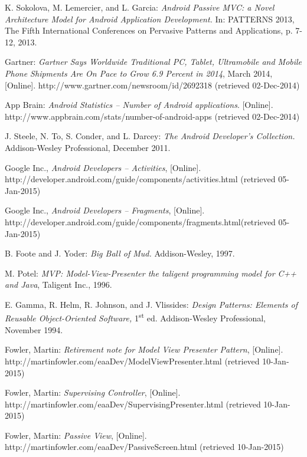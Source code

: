 \begin{thebibliography}{1}

K. Sokolova, M. Lemercier, and L. Garcia: \emph{Android Passive MVC: a Novel Architecture Model for Android Application Development.} In: PATTERNS 2013, The Fifth International Conferences on Pervasive Patterns and Applications, p. 7-12, 2013.

Gartner: \emph{Gartner Says Worldwide Traditional PC, Tablet, Ultramobile and 
Mobile Phone Shipments Are On Pace to Grow 6.9 Percent in 2014}, March 2014, 
[Online]. http://www.gartner.com/newsroom/id/2692318 (retrieved 02-Dec-2014)

App Brain: \emph{Android Statistics -- Number of Android applications}. 
[Online].
http://www.appbrain.com/stats/number-of-android-apps (retrieved 02-Dec-2014)

J. Steele, N. To, S. Conder, and L. Darcey: \emph{The Android Developer's Collection.} Addison-Wesley Professional, December 2011.

Google Inc., \emph{Android Developers -- Activities},
[Online]. http://developer.android.com/guide/components/activities.html (retrieved 05-Jan-2015)

Google Inc., \emph{Android Developers -- Fragments},
[Online]. http://developer.android.com/guide/components/fragments.html(retrieved 05-Jan-2015)

B. Foote and J. Yoder: \emph{Big Ball of Mud.} Addison-Wesley, 1997.

M. Potel: \emph{MVP: Model-View-Presenter the taligent programming model for C++ and Java}, Taligent Inc., 1996.

E. Gamma, R. Helm, R. Johnson, and J. Vlissides: \emph{Design Patterns: Elements of Reusable Object-Oriented Software,} 1\textsuperscript{st} ed. Addison-Wesley Professional, November 1994.

Fowler, Martin: \emph{Retirement note for Model View Presenter Pattern},
[Online]. http://martinfowler.com/eaaDev/ModelViewPresenter.html (retrieved 10-Jan-2015)

Fowler, Martin: \emph{Supervising Controller},
[Online]. http://martinfowler.com/eaaDev/SupervisingPresenter.html (retrieved 10-Jan-2015)

Fowler, Martin: \emph{Passive View},
[Online]. http://martinfowler.com/eaaDev/PassiveScreen.html (retrieved 10-Jan-2015)



\end{thebibliography}